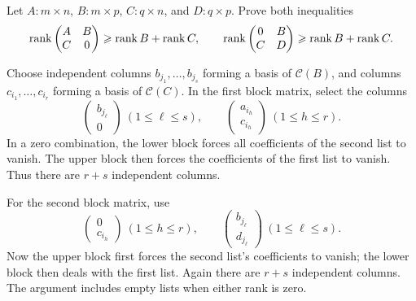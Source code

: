 \begin{problem}\label{ex:04:zero-corner}
Let \(A:m\times n\), \(B:m\times p\), \(C:q\times n\), and \(D:q\times p\).
Prove both inequalities
\[
\operatorname{rank}\begin{pmatrix}A&B\\C&0\end{pmatrix}\geqslant\operatorname{rank} B+\operatorname{rank} C,
\qquad
\operatorname{rank}\begin{pmatrix}0&B\\C&D\end{pmatrix}\geqslant\operatorname{rank} B+\operatorname{rank} C.
\]
\end{problem}
\begin{solution}
Choose independent columns \(b_{j_1},\ldots,b_{j_s}\) forming a basis of
\(\mathcal C(B)\), and columns \(c_{i_1},\ldots,c_{i_r}\) forming a
basis of \(\mathcal C(C)\).
In the first block matrix, select the columns
\[
\begin{pmatrix}b_{j_\ell}\\0\end{pmatrix}\ (1\leqslant\ell\leqslant s),
\qquad
\begin{pmatrix}a_{i_h}\\c_{i_h}\end{pmatrix}\ (1\leqslant h\leqslant r).
\]
In a zero combination, the lower block forces all coefficients of the
second list to vanish. The upper block then forces the coefficients of
the first list to vanish. Thus there are \(r+s\) independent columns.

For the second block matrix, use
\[
\begin{pmatrix}0\\c_{i_h}\end{pmatrix}\ (1\leqslant h\leqslant r),
\qquad
\begin{pmatrix}b_{j_\ell}\\d_{j_\ell}\end{pmatrix}\ (1\leqslant\ell\leqslant s).
\]
Now the upper block first forces the second list's coefficients to vanish;
the lower block then deals with the first list. Again there are \(r+s\)
independent columns. The argument includes empty lists when either rank is zero.
\end{solution}

